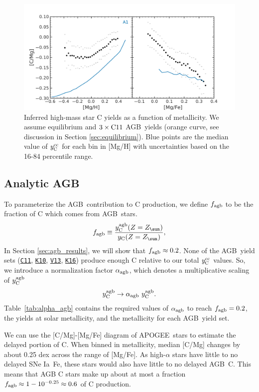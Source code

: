 \documentclass[fleqn,usenatbib]{mnras}
\newcommand{\cxi}{\texttt{\hyperlink{C11}{C11}}}
\newcommand{\kx}{\texttt{\hyperlink{K10}{K10}}}
\newcommand{\kxvi}{\texttt{\hyperlink{K16}{K16}}}
\newcommand{\vxiii}{\texttt{\hyperlink{V13}{V13}}}
\newcommand{\agb}{AGB}
\newcommand{\apogee}{APOGEE}
\newcommand{\ia}{SNe Ia}
\newcommand{\caafe}{[C/Mg]-[Mg/Fe]}
\newcommand{\Yct}{\ensuremath{y_{\rm C}}}
\newcommand{\Ycc}{\ensuremath{y_{\rm C}^{\rm cc}}}
\newcommand{\Ycagb}{\ensuremath{y_{\rm C}^{\rm agb}}}
\newcommand{\Zo}{%
    \ifmmode Z_{\sun}%
    \else $Z_{\sun}$%
    \fi}
\begin{document}
\begin{figure}
    \centering
    \includegraphics{analytic.pdf}
    \caption[]{Inferred high-mass star C yields as a function of metallicity. We assume equilibrium and $3\times {\rm C11}$ \agb\ yields (orange curve, see discussion in Section \ref{sec:equilibrium}). Blue points are the median value of $\Ycc$ for each bin in [Mg/H] with uncertainties based on the 16-84 percentile range.
    }
    \label{fig:analytic}
\end{figure}



\subsection{Analytic AGB}

To parameterize the \agb\ contribution to C production, we define $f_{\rm agb}$ to be the fraction of C which comes from \agb\ stars. 
\begin{equation}\label{eq:f_agb}
    f_{\rm agb} \equiv \frac{\Ycagb(Z=\Zo)}{\Yct(Z=\Zo)},
\end{equation}
In Section \ref{sec:agb_results}, we will show that $f_{\rm agb} \approx 0.2$. 
None of the \agb\ yield sets (\cxi{}, \kx{}, \vxiii{}, \kxvi{}) produce enough C relative to our total $\Ycc$ values. So, we introduce a normalization factor $\alpha_{\rm agb}$, which denotes a multiplicative scaling of $\Ycagb$ 
\begin{equation} \label{eq:alpha}
        \Ycagb \rightarrow \alpha_{\rm agb}\ \Ycagb.
\end{equation}
Table~\ref{tab:alpha_agb} contains the required values of $\alpha_{\rm agb}$ to reach $f_{\rm agb}=0.2$, the yields at solar metallicity, and the metallicity for each \agb\ yield set.

We can use the \caafe{} diagram of \apogee\ stars to estimate the delayed portion of C. When binned in metallicity, median [C/Mg] changes by about 0.25 dex across the range of [Mg/Fe]. As high-$\alpha$ stars have little to no delayed \ia\ Fe, these stars would also have little to no delayed \agb\ C. This means that AGB C stars make up about at most a fraction $f_{\rm agb} \approx 1 - 10^{-0.25} \approx 0.6$ of C production.
\end{document}

